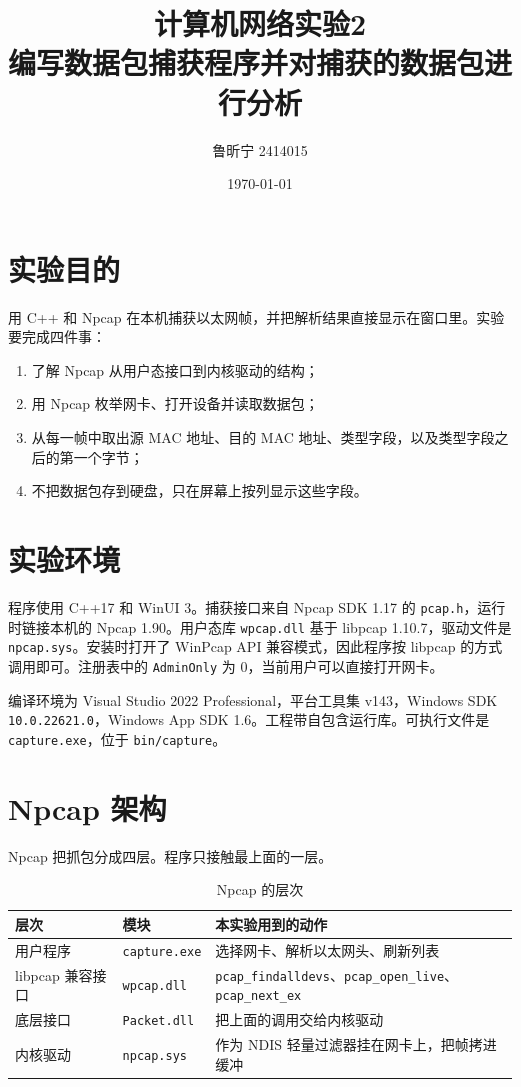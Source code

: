 \documentclass[10.5pt,a4paper,UTF8]{article}
\title{计算机网络实验2\\编写数据包捕获程序并对捕获的数据包进行分析}
\author{鲁昕宁 2414015}
\date{\today}
\begin{document}
\begin{titlepage}
\maketitle
\end{titlepage}

\section{实验目的}
用 C++ 和 Npcap 在本机捕获以太网帧，并把解析结果直接显示在窗口里。实验要完成四件事：
\begin{enumerate}[leftmargin=2em]
    \item 了解 Npcap 从用户态接口到内核驱动的结构；
    \item 用 Npcap 枚举网卡、打开设备并读取数据包；
    \item 从每一帧中取出源 MAC 地址、目的 MAC 地址、类型字段，以及类型字段之后的第一个字节；
    \item 不把数据包存到硬盘，只在屏幕上按列显示这些字段。
\end{enumerate}

\section{实验环境}
程序使用 C++17 和 WinUI 3。捕获接口来自 Npcap SDK 1.17 的 \texttt{pcap.h}，运行时链接本机的 Npcap 1.90。用户态库 \texttt{wpcap.dll} 基于 libpcap 1.10.7，驱动文件是 \texttt{npcap.sys}。安装时打开了 WinPcap API 兼容模式，因此程序按 libpcap 的方式调用即可。注册表中的 \texttt{AdminOnly} 为 0，当前用户可以直接打开网卡。

编译环境为 Visual Studio 2022 Professional，平台工具集 v143，Windows SDK \texttt{10.0.22621.0}，Windows App SDK 1.6。工程带自包含运行库。可执行文件是 \texttt{capture.exe}，位于 \texttt{bin/capture}。

\section{Npcap 架构}
Npcap 把抓包分成四层。程序只接触最上面的一层。

\begin{table}[htbp]
\centering
\caption{Npcap 的层次}
\label{tab:stack}
\small
\setlength{\tabcolsep}{4pt}
\begin{tabular}{lll}
\toprule
层次 & 模块 & 本实验用到的动作 \\
\midrule
用户程序 & \texttt{capture.exe} & 选择网卡、解析以太网头、刷新列表 \\
libpcap 兼容接口 & \texttt{wpcap.dll} & \texttt{pcap\_findalldevs}、\texttt{pcap\_open\_live}、\texttt{pcap\_next\_ex} \\
底层接口 & \texttt{Packet.dll} & 把上面的调用交给内核驱动 \\
内核驱动 & \texttt{npcap.sys} & 作为 NDIS 轻量过滤器挂在网卡上，把帧拷进缓冲 \\
\bottomrule
\end{tabular}
\end{table}
\end{document}

